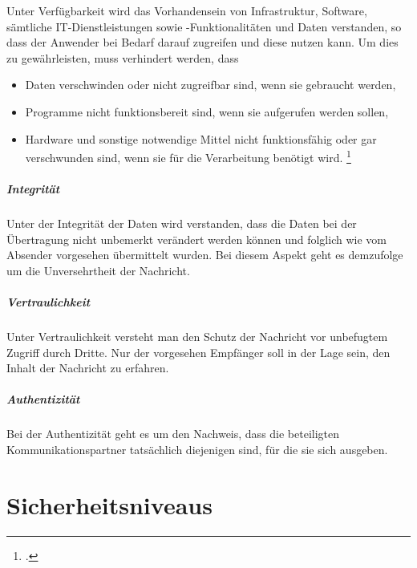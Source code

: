 \documentclass  [paper=a4,
				fontsize=12pt,
				listof=totoc,
				bibliography=totoc
				]{scrreprt}
\begin{document}
	Unter Verfügbarkeit wird das Vorhandensein von Infrastruktur, Software, sämtliche IT-Dienstleistungen sowie -Funktionalitäten und Daten verstanden, so dass der Anwender bei Bedarf darauf zugreifen und diese nutzen kann. Um dies zu gewährleisten, muss verhindert werden, dass
	\begin{itemize}
	\item Daten verschwinden oder nicht zugreifbar sind, wenn sie gebraucht werden,
	\item Programme nicht funktionsbereit sind, wenn sie aufgerufen werden sollen,
	\item Hardware und sonstige notwendige Mittel nicht funktionsfähig oder gar verschwunden sind, wenn sie für die Verarbeitung benötigt wird. \footcite[Vgl.][]{Berliner2014}
	\end{itemize}
	
	\paragraph{Integrität}
	
	Unter der Integrität der Daten wird verstanden, dass die Daten bei der Übertragung nicht unbemerkt verändert werden können und folglich wie vom Absender vorgesehen übermittelt wurden. Bei diesem Aspekt geht es demzufolge um die Unversehrtheit der Nachricht.
	
	\paragraph{Vertraulichkeit}
	
	Unter Vertraulichkeit versteht man den Schutz der Nachricht vor unbefugtem Zugriff durch Dritte. Nur der vorgesehen Empfänger soll in der Lage sein, den Inhalt der Nachricht zu erfahren.
	
	\paragraph{Authentizität}
	
	Bei der Authentizität geht es um den Nachweis, dass die beteiligten Kommunikationspartner tatsächlich diejenigen sind, für die sie sich ausgeben.
	
	\chapter{Sicherheitsniveaus}\label{chap:sicherheitsniveaus}
	
\end{document}
